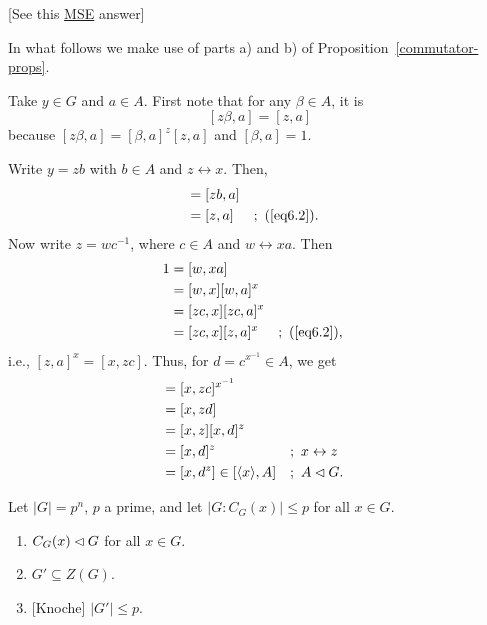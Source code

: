 \begin{solution} {[See this \href{https://math.stackexchange.com/a/1484227/269050}{MSE} answer]}

In what follows we make use of parts a) and b) of Proposition~\ref{commutator-props}.

Take $y\in G$ and $a\in A$. First note that for any $\beta\in A$, it is
\begin{equation}\label{eq6.2}
    [z\beta,a] = [z,a]
\end{equation}
because $[z\beta,a]=[\beta,a]^z[z,a]$ and $[\beta,a]=1$.

Write $y=zb$ with $b\in A$ and $z\leftrightarrow x$. Then,
\begin{align*}
    [y,a] &= [zb,a]\\
        &= [z,a]    &&;\ (\ref{eq6.2}).
\end{align*}
Now write $z=wc^{-1}$, where $c\in A$ and $w\leftrightarrow xa$. Then
\begin{align*}
    1 &= [w,xa]\\
        &= [w,x][w,a]^x\\
        &= [zc,x][zc,a]^x\\
        &= [zc,x][z,a]^x    &&;\ (\ref{eq6.2}),
\end{align*}
i.e., $[z,a]^x=[x,zc]$. Thus, for $d=c^{x^{-1}}\in A$, we get
\begin{align*}
    [z,a] &= [x,zc]^{x^{-1}}\\
        &= [x,zd]\\
        &= [x,z][x,d]^z\\
        &= [x,d]^z  &&;\ x\leftrightarrow z\\
        &= [x,d^z] \in [\gen x,A]   &&;\ A\normal G.
\end{align*}
 \end{solution}

\begin{exr}\label{exercise-1.5.3}
    Let\/ $|G| = p^n$, $p$ a prime, and let\/ $|G:C_G(x)|\le p$ for all\/ $x\in G$.
    \begin{enumerate}[\rm a)]
      \item $C_G(x) \lhd G$ for all\/ $x\in G$.
      \item $G' \subseteq Z(G)$.
      \item \textrm{\rm [Knoche]} $|G'|\le p$.
    \end{enumerate}
\end{exr}

